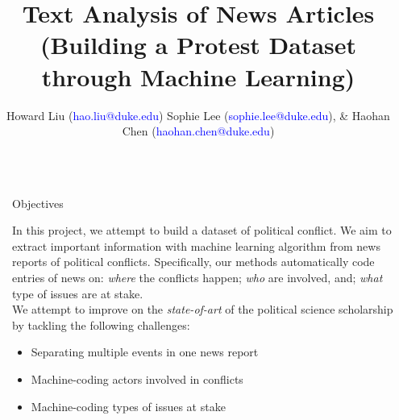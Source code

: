 \documentclass[final]{beamer}
\title{Text Analysis of News Articles \\
(Building a Protest Dataset through Machine Learning) } %
\author{Howard Liu (\textcolor{blue}{hao.liu@duke.edu}) Sophie Lee (\textcolor{blue}{sophie.lee@duke.edu}), \& Haohan Chen (\textcolor{blue}{haohan.chen@duke.edu})} %
\institute{Department of Political Science, Duke University} %
\newlength{\sepwid}
\newlength{\onecolwid}
\begin{document}

\setlength{\belowcaptionskip}{2ex} %
\setlength\belowdisplayshortskip{2ex} %

\begin{frame}[t] %

\begin{columns}[t] %

\begin{column}{\sepwid}\end{column} %

\begin{column}{\onecolwid} %


\begin{alertblock}{Objectives}

In this project, we attempt to build a dataset of political conflict. We aim to extract important information with machine learning algorithm from news reports of political conflicts. Specifically, our methods automatically code entries of news on: \textit{where} the conflicts happen; \textit{who} are involved, and; \textit{what} type of issues are at stake. \\

We attempt to improve on the \textit{state-of-art} of the political science scholarship by tackling the following challenges:
\begin{itemize}
	\item Separating multiple events in one news report
	\item Machine-coding actors involved in conflicts
	\item Machine-coding types of issues at stake 
\end{itemize}

\end{alertblock}


\end{column}
\end{columns}
\end{frame}
\end{document}
